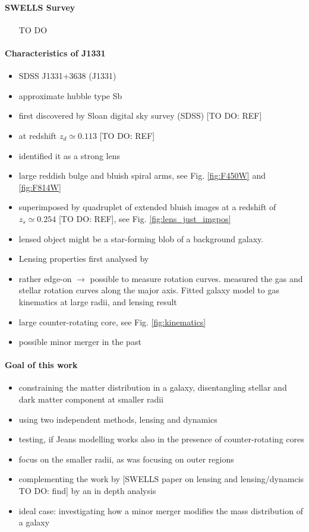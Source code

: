 \paragraph{SWELLS Survey}
\begin{itemize}
\item [TO DO]
\end{itemize}


\paragraph{Characteristics of J1331}
\begin{itemize}
\item SDSS J1331+3638 (J1331)
\item approximate hubble type Sb
\item first discovered by Sloan digital sky survey (SDSS) [TO DO: REF]
\item at redshift $z_d\simeq0.113$ [TO DO: REF]
\item \citet{SWELLSI} identified it as a strong lens
\item large reddish bulge and bluish spiral arms, see Fig. \ref{fig:F450W} and \ref{fig:F814W}
\item superimposed by quadruplet of extended bluish images at a redshift of $z_s\simeq0.254$ [TO DO: REF], see Fig. \ref{fig:lens_just_imgpos}
\item lensed object might be a star-forming blob of a background galaxy.
\item Lensing properties first analysed by \citet{SWELLSIII}
\item rather edge-on $\longrightarrow$ possible to measure rotation curves. \citet{SWELLSV} measured the gas and stellar rotation curves along the major axis. Fitted galaxy model to gas kinematics at large radii, and lensing result
\item large counter-rotating core, see Fig. \ref{fig:kinematics}
\item possible minor merger in the past
\end{itemize}

\paragraph{Goal of this work}
\begin{itemize}
\item constraining the matter distribution in a galaxy, disentangling stellar and dark matter component at smaller radii
\item using two independent methods, lensing and dynamics
\item testing, if Jeans modelling works also in the presence of counter-rotating cores
\item focus on the smaller radii, as \citet{SWELLSV} was focusing on outer regions
\item complementing the work by [SWELLS paper on lensing and lensing/dynamcis TO DO: find] by an in depth analysis
\item ideal case: investigating how a minor merger modifies the mass distribution of a galaxy
\end{itemize}


